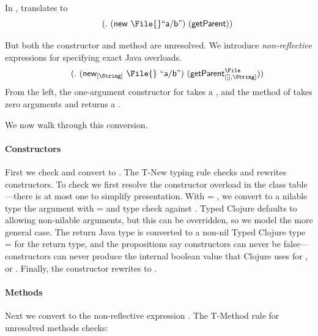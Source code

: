 In , 
translates to
\begin{equation}  \label{eq:unresolved}
  \qquad {\methodexp {\getparent{}} {\newexp {\File{}} {\makestr{a/b}}} {}}
\end{equation}

But both the constructor and method are unresolved.
We introduce \emph{non-reflective} expressions for specifying exact Java overloads.
\begin{equation} \label{eq:resolved}
\qquad {\methodstaticexp {\File} {} {\String} {\getparent{}} {\newstaticexp {\String} {\File{}} {\File{}} {\makestr{a/b}}} {}}
\end{equation}
From the left, the one-argument constructor for \File takes a \String, and the 
\getparent{} method of
\File{} takes zero arguments
and
returns a \String.

We now walk through this conversion.%

\paragraph{Constructors} First we check and convert {\newexp {\File{}} {}} to {\newstaticexp {\String} {\File{}} {\File{}} {}}.
The T-New typing rule checks and rewrites constructors.
To check
{\newexp {\File{}} {}}
we first resolve the constructor overload in the class table---there is at most one
to simplify presentation.
With  = \String,
we convert to a nilable type the argument with  = \Union{\Nil}{\String}
and type check {} against .
Typed Clojure defaults to allowing non-nilable arguments, but this
can be overridden, so we model the more general case.
The return Java type \File is converted to a non-nil
Typed Clojure type \ty{} = \File for the return type,
and the propositions say constructors can never be false---constructors
can never produce the internal boolean value that Clojure uses for \false{}, or \nil{}.
Finally, the constructor rewrites to {\newstaticexp {\String} {\File{}} {\File{}} {}}.

\paragraph{Methods} Next we convert {\methodexp {\getparent{}} {\newstaticexp {\String} {\File{}} {\File{}} {}} {}}
to the non-reflective expression
{\methodstaticexp {\File} {} {\String} {\getparent{}} {\newstaticexp {\String} {\File{}} {\File{}} {}} {}}.
The T-Method rule for unresolved methods
checks:

